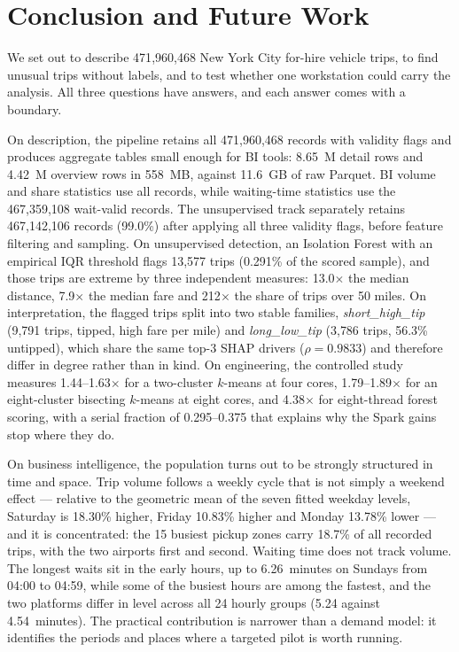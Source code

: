 \documentclass[11pt,a4paper]{article}
\begin{document}
\section{Conclusion and Future Work}

We set out to describe 471{,}960{,}468 New York City for-hire vehicle trips, to find unusual trips without labels, and to test whether one workstation could carry the analysis. All three questions have answers, and each answer comes with a boundary.

On description, the pipeline retains all 471{,}960{,}468 records with validity flags and produces aggregate tables small enough for BI tools: 8.65~M detail rows and 4.42~M overview rows in 558~MB, against 11.6~GB of raw Parquet. BI volume and share statistics use all records, while waiting-time statistics use the 467{,}359{,}108 wait-valid records. The unsupervised track separately retains 467{,}142{,}106 records (99.0\%) after applying all three validity flags, before feature filtering and sampling. On unsupervised detection, an Isolation Forest with an empirical IQR threshold flags 13{,}577 trips (0.291\% of the scored sample), and those trips are extreme by three independent measures: 13.0$\times$ the median distance, 7.9$\times$ the median fare and 212$\times$ the share of trips over 50 miles. On interpretation, the flagged trips split into two stable families, \emph{short\_high\_tip} (9{,}791 trips, tipped, high fare per mile) and \emph{long\_low\_tip} (3{,}786 trips, 56.3\% untipped), which share the same top-3 SHAP drivers ($\rho = 0.9833$) and therefore differ in degree rather than in kind. On engineering, the controlled study measures 1.44--1.63$\times$ for a two-cluster $k$-means at four cores, 1.79--1.89$\times$ for an eight-cluster bisecting $k$-means at eight cores, and 4.38$\times$ for eight-thread forest scoring, with a serial fraction of 0.295--0.375 that explains why the Spark gains stop where they do.

On business intelligence, the population turns out to be strongly structured in time and
space. Trip volume follows a weekly cycle that is not simply a weekend effect ---
relative to the geometric mean of the seven fitted weekday levels, Saturday is 18.30\%
higher, Friday 10.83\% higher and Monday 13.78\% lower --- and it is concentrated: the 15
busiest pickup zones carry 18.7\% of all recorded trips, with the two airports first and
second. Waiting time does not track volume. The longest waits sit in the early hours, up
to 6.26~minutes on Sundays from 04:00 to 04:59, while some of the busiest hours are among
the fastest, and the two platforms differ in level across all 24 hourly groups
(5.24 against 4.54~minutes). The practical contribution is narrower than a demand model:
it identifies the periods and places where a targeted pilot is worth running.
\end{document}
